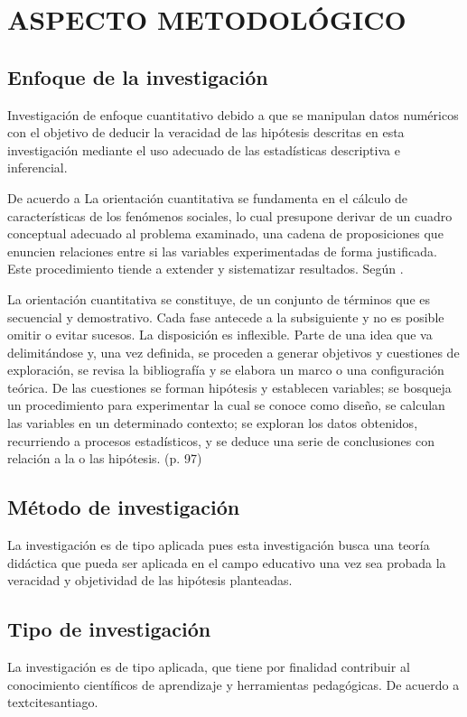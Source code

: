 \documentclass[12pt,a4paper]{article}
\begin{document}
\section{ASPECTO METODOLÓGICO}

\subsection{Enfoque de la investigación}
Investigación de enfoque cuantitativo debido a que se manipulan datos numéricos con el objetivo de deducir la veracidad de las hipótesis descritas en esta investigación mediante el uso adecuado de las estadísticas descriptiva e inferencial.

De acuerdo a \cite{bernal} La orientación cuantitativa se fundamenta en el cálculo de características de los fenómenos sociales, lo cual presupone derivar de un cuadro conceptual adecuado al problema examinado, una cadena de proposiciones que enuncien relaciones entre si las variables experimentadas de forma justificada. Este procedimiento tiende a extender y sistematizar resultados. Según \cite{inv1}.

\begin{displayquote}
{La orientación cuantitativa se constituye, de un conjunto de términos que es secuencial y demostrativo. Cada fase antecede a la subsiguiente y no es posible omitir o evitar sucesos. La disposición es inflexible. Parte de una idea que va delimitándose y, una vez definida, se proceden a generar objetivos y cuestiones de exploración, se revisa la bibliografía y se elabora un marco o una configuración teórica. De las cuestiones se forman hipótesis y establecen variables; se bosqueja un procedimiento para experimentar la cual se conoce como diseño, se calculan las variables en un determinado contexto; se exploran los datos obtenidos, recurriendo a procesos estadísticos, y se deduce una serie de conclusiones con relación a la o las hipótesis}. (p. 97)
\end{displayquote}

\subsection{Método de investigación}

La investigación es de tipo aplicada pues esta investigación busca una teoría didáctica que pueda ser aplicada en el campo educativo una vez sea probada la veracidad y objetividad de las hipótesis planteadas. 

\subsection{Tipo de investigación}
La investigación es de tipo aplicada, que tiene por finalidad contribuir al conocimiento científicos de aprendizaje y herramientas pedagógicas. De acuerdo a textcite{santiago}.%
\end{document}
